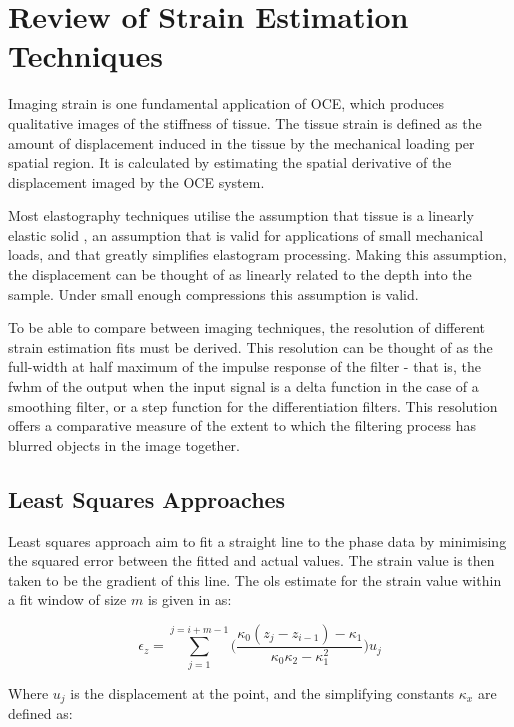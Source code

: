 \chapter{Review of Strain Estimation Techniques}\label{review}

Imaging strain is one fundamental application of OCE, which produces qualitative images of the stiffness of tissue. The tissue strain is defined as the amount of displacement induced in the tissue by the mechanical loading per spatial region. It is calculated by estimating the spatial derivative of the displacement imaged by the OCE system. 

Most elastography techniques utilise the assumption that tissue is a linearly elastic solid \cite{kennedy_review_2014}, an assumption that is valid for applications of small mechanical loads, and that greatly simplifies elastogram processing. Making this assumption, the displacement can be thought of as linearly related to the depth into the sample. Under small enough compressions this assumption is valid. 

To be able to compare between imaging techniques, the resolution of different strain estimation fits must be derived. This resolution can be thought of as the full-width at half maximum of the impulse response of the filter - that is, the \ac{fwhm} of the output when the input signal is a delta function in the case of a smoothing filter, or a step function for the differentiation filters. This resolution offers a comparative measure of the extent to which the filtering process has blurred objects in the image together. 

\section{Least Squares Approaches}\label{least_squares}
Least squares approach aim to fit a straight line to the phase data by minimising the squared error between the fitted and actual values. The strain value is then taken to be the gradient of this line. The \ac{ols} estimate for the strain value within a fit window of size $m$ is given in \cite{kennedy_strain_2012} as:

\begin{equation}
	\label{ols_strain}
	\epsilon_z = \sum\limits_{j=1}^{j=i+m-1} \bigg(\frac{\kappa_0 (z_j-z_{i-1})-\kappa_1}{\kappa_0 \kappa_2 - \kappa_1^2} \bigg) u_j
\end{equation}

Where $u_j$ is the displacement at the point, and the simplifying constants $\kappa_x$ are defined as:

